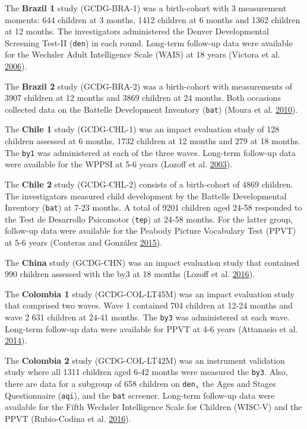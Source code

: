 \documentclass[
]{book}
\begin{document}
The \textbf{Brazil 1} study (GCDG-BRA-1) was a birth-cohort with 3 measurement moments: 644 children at 3 months, 1412 children at 6 months and 1362 children at 12 months. The investigators administered the Denver Developmental Screening Test-II (\texttt{den}) in each round. Long-term follow-up data were available for the Wechsler Adult Intelligence Scale (WAIS) at 18 years (Victora et al. \protect\hyperlink{ref-Victora2006}{2006}).

The \textbf{Brazil 2} study (GCDG-BRA-2) was a birth-cohort with measurements of 3907 children at 12 months and 3869 children at 24 months. Both occasions collected data on the Battelle Development Inventory (\texttt{bat}) (Moura et al. \protect\hyperlink{ref-Moura2010}{2010}).

The \textbf{Chile 1} study (GCDG-CHL-1) was an impact evaluation study of 128 children assessed at 6 months, 1732 children at 12 months and 279 at 18 months. The \texttt{by1} was administered at each of the three waves. Long-term follow-up data were available for the WPPSI at 5-6 years (Lozoff et al. \protect\hyperlink{ref-Lozoff2003}{2003}).

The \textbf{Chile 2} study (GCDG-CHL-2) consists of a birth-cohort of 4869 children. The investigators measured child development by the Battelle Developmental Inventory (\texttt{bat}) at 7-23 months. A total of 9201 children aged 24-58 responded to the Test de Desarrollo Psicomotor (\texttt{tep}) at 24-58 months. For the latter group, follow-up data were available for the Peabody Picture Vocabulary Test (PPVT) at 5-6 years (Conteras and González \protect\hyperlink{ref-conteras2015}{2015}).

The \textbf{China} study (GCDG-CHN) was an impact evaluation study that contained 990 children assessed with the by3 at 18 months (Lozoff et al. \protect\hyperlink{ref-Lozoff2016}{2016}).

The \textbf{Colombia 1} study (GCDG-COL-LT45M) was an impact evaluation study that comprised two waves. Wave 1 contained 704 children at 12-24 months and wave 2 631 children at 24-41 months. The \texttt{by3} was administered at each wave. Long-term follow-up data were available for PPVT at 4-6 years (Attanasio et al. \protect\hyperlink{ref-Attanasio2014}{2014}).

The \textbf{Colombia 2} study (GCDG-COL-LT42M) was an instrument validation study where all 1311 children aged 6-42 months were measured the \texttt{by3}. Also, there are data for a subgroup of 658 children on \texttt{den,} the Ages and Stages Questionnaire (\texttt{aqi}), and the \texttt{bat} screener. Long-term follow-up data were available for the Fifth Wechsler Intelligence Scale for Children (WISC-V) and the PPVT (Rubio-Codina et al. \protect\hyperlink{ref-Rubio-Codina2016}{2016}).
\end{document}
